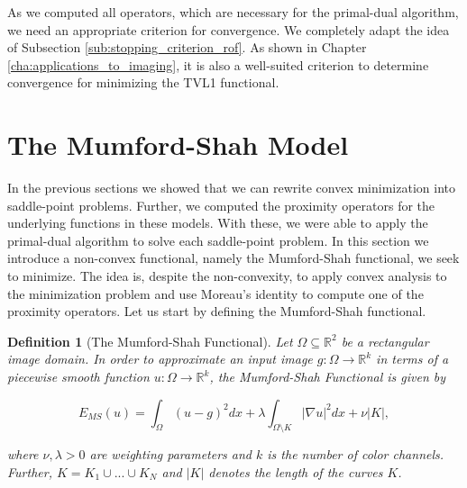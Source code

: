 \documentclass[abstracton]{scrreprt}
\newtheorem{definition}[theorem]{Definition}
\begin{document}
            As we computed all operators, which are necessary for the primal-dual algorithm, we need an appropriate criterion for convergence. We completely adapt the idea of Subsection \ref{sub:stopping_criterion_rof}. As shown in Chapter \ref{cha:applications_to_imaging}, it is also a well-suited criterion to determine convergence for minimizing the TVL1 functional.

    \section{The Mumford-Shah Model} %
    \label{sec:the_mumford_shah_model}
        
        In the previous sections we showed that we can rewrite convex minimization into saddle-point problems. Further, we computed the proximity operators for the underlying functions in these models. With these, we were able to apply the primal-dual algorithm to solve each saddle-point problem. In this section we introduce a non-convex functional, namely the Mumford-Shah functional, we seek to minimize. The idea is, despite the non-convexity, to apply convex analysis to the minimization problem and use Moreau's identity to compute one of the proximity operators. Let us start by defining the Mumford-Shah functional.
        \begin{definition}[The Mumford-Shah Functional] %
        \label{def:the_mumford_shah_functional}
            Let $\Omega \subseteq \mathbb{R}^{2}$ be a rectangular image domain. In order to approximate an input image $g: \Omega \longrightarrow \mathbb{R}^{k}$ in terms of a piecewise smooth function $u: \Omega \longrightarrow \mathbb{R}^{k}$, the Mumford-Shah Functional is given by
                    
                    \begin{equation}
                        E_{MS}(u) = \int_{\Omega} (u - g)^{2} dx + \lambda \int_{\Omega \setminus K} |\nabla u|^{2} dx + \nu |K|,
                    \end{equation}
                    \label{eq:the_mumford_shah_functional}
                
                where $\nu, \lambda > 0$ are weighting parameters and $k$ is the number of color channels. Further, $K = K_{1} \cup ... \cup K_{N}$ and $|K|$ denotes the length of the curves $K$.
        \end{definition}
\end{document}
